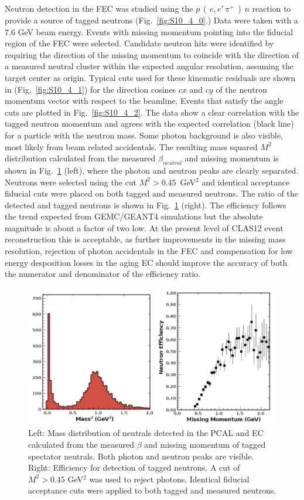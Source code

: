 Neutron detection in the FEC was studied using the $p\,(\,e,e'\,\pi^+\,)\,n$ reaction to provide a source of tagged neutrons (Fig.~\ref{fig:S10_4_0}.) Data were taken with a 7.6 GeV beam energy.  Events with missing momentum pointing into the fiducial region of the FEC were selected.  Candidate neutron hits were identified by requiring the direction of the missing momentum to coincide with the direction of a measured neutral cluster within the expected angular resolution, assuming the target center as origin.  Typical cuts used for these kinematic residuals are shown in (Fig.~\ref{fig:S10_4_1}) for the direction cosines $cx$ and $cy$ of the neutron momentum vector with respect to the beamline.  Events that satisfy the angle cuts are plotted in Fig.~\ref{fig:S10_4_2}.  The data show a clear correlation with the tagged neutron momentum and agrees with the expected correlation (black line) for a particle with the neutron mass.  Some photon background is also visible, most likely from beam related accidentals. The resulting mass squared $M^2$ distribution calculated from the measured $\beta_{neutral}$ and missing momentum is shown in Fig.~\ref{fig:S10_4_3} (left), where the photon and neutron peaks are clearly separated.  Neutrons were selected using the cut $M^2 > 0.45$~GeV$^2$ and identical acceptance fiducial cuts were placed on both tagged and measured neutrons.  The ratio of the detected and tagged neutrons is shown in Fig.~\ref{fig:S10_4_3} (right).  The efficiency follows the trend expected from GEMC/GEANT4 simulations but the absolute magnitude is about a factor of two low.  At the present level of CLAS12 event reconstruction this is acceptable, as further improvements in the missing mass resolution,  rejection of photon accidentals in the FEC and compensation for low energy desposition losses in the aging EC should improve the accuracy of both the numerator and denominator of the efficiency ratio. 

\begin{figure}[h]
\centering
\includegraphics[width=1.0\columnwidth,keepaspectratio]{img/S10_4_3.png}
\caption[]{Left: Mass distribution of neutrals detected in the PCAL and EC calculated from the measured $\beta$ and missing momentum of tagged spectator neutrals.  Both photon and neutron peaks are visible. Right: Efficiency for detection of tagged neutrons.  A cut of $M^2>0.45$ GeV$^2$ was used to reject photons.  Identical fiducial acceptance cuts were applied to both tagged and measured neutrons.}
\label{fig:S10_4_3}
\end{figure}



